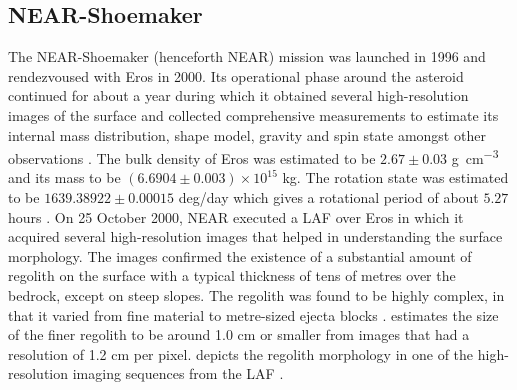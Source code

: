 \subsection{NEAR-Shoemaker}
\label{subsec:near_heritage}
The \gls{NEAR}-Shoemaker (henceforth \gls{NEAR}) mission was launched in 1996 and rendezvoused with Eros in 2000. Its operational phase around the asteroid continued for about a year during which it obtained several high-resolution images of the surface and collected comprehensive measurements to estimate its internal mass distribution, shape model, gravity and spin state amongst other observations \parencite{scheeresBook}. The bulk density of Eros was estimated to be $2.67 \pm 0.03$ \si{\gram\per\centi\metre\cubed} and its mass to be $(6.6904 \pm 0.003) \times 10^{15}$ \si{\kilo\gram}. The rotation state was estimated to be $1639.38922 \pm 0.00015$ deg/day which gives a rotational period of about $5.27$ hours \parencite{erosShapeDetermination}. On 25 October 2000, \gls{NEAR} executed a \gls{LAF} over Eros in which it acquired several high-resolution images that helped in understanding the surface morphology. The images confirmed the existence of a substantial amount of regolith on the surface with a typical thickness of tens of metres over the bedrock, except on steep slopes. The regolith was found to be highly complex, in that it varied from fine material to metre-sized ejecta blocks \parencite{Veverka2001}. \cite{Robinson2001} estimates the size of the finer regolith to be around 1.0 \si{\centi\metre} or smaller from images that had a resolution of 1.2 \si{\centi\metre} per pixel.  depicts the regolith morphology in one of the high-resolution imaging sequences from the \gls{LAF} \parencite{veverka2001landing}.
